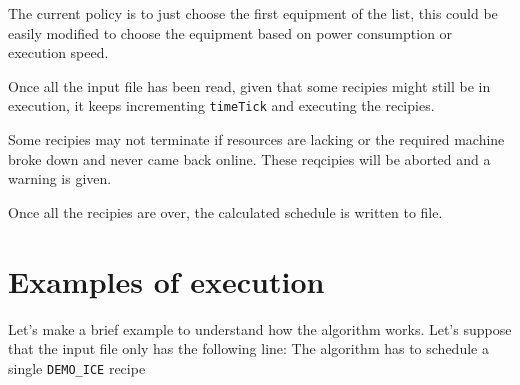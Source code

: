 \documentclass[12pt]{article}
\newcommand{\code}[1]{\colorbox{light-gray}{\texttt{#1}}}
\begin{document}
The current policy is to just choose the first equipment of the list, this could be easily modified to choose the equipment based on power consumption or execution speed.

Once all the input file has been read, given that some recipies might still be in execution, it keeps incrementing \code{timeTick} and executing the recipies.

Some recipies may not terminate if resources are lacking or the required machine broke down and never came back online. These reqcipies will be aborted and a warning is given.

Once all the recipies are over, the calculated schedule is written to file.

\section{Examples of execution}
Let's make a brief example to understand how the algorithm works.
Let's suppose that the input file only has the following line:
The algorithm has to schedule a single \code{DEMO\_ICE} recipe
\end{document}
